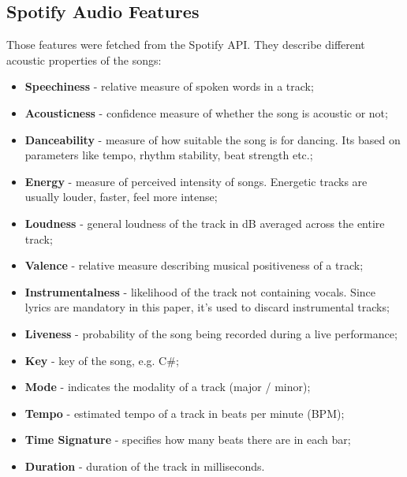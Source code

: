 \subsection{Spotify Audio Features}
\label{sec:spotifyaudiofeatures}
Those features were fetched from the Spotify API. They describe different
acoustic properties of the songs:
\begin{itemize}
  \item \textbf{Speechiness} - relative measure of spoken words in a track;
  \item \textbf{Acousticness} - confidence measure of whether the song is
    acoustic or not;
  \item \textbf{Danceability} - measure of how suitable the song is for
    dancing. Its based on parameters like tempo, rhythm stability, beat
    strength etc.;
  \item \textbf{Energy} - measure of perceived intensity of songs. Energetic
    tracks are usually louder, faster, feel more intense;
  \item \textbf{Loudness} - general loudness of the  track in dB averaged
    across the entire track;
  \item \textbf{Valence} - relative measure describing musical positiveness of
    a track;
  \item \textbf{Instrumentalness} - likelihood of the track not containing
    vocals. Since lyrics are mandatory in this paper, it's used to discard
    instrumental tracks;
  \item \textbf{Liveness} - probability of the song being recorded during a
    live performance;
  \item \textbf{Key} - key of the song, e.g. C\#;
  \item \textbf{Mode} - indicates the modality of a track (major / minor);
  \item \textbf{Tempo} - estimated tempo of a track in beats per minute (BPM);
  \item \textbf{Time Signature} - specifies how many beats there are in each
    bar;
  \item \textbf{Duration} - duration of the track in milliseconds.
\end{itemize}


